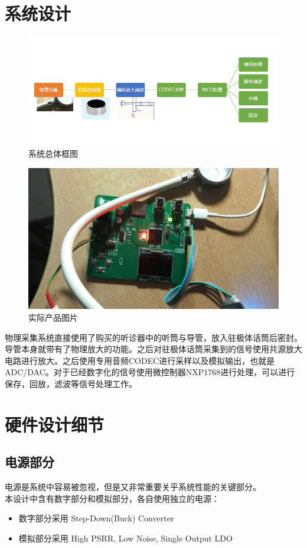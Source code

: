 \documentclass[16pt,a4paper]{article}
\begin{document}
\section{系统设计}
\begin{figure}[H]
\centering
\includegraphics[scale=0.8]{system.png}
\caption{系统总体框图}
\end{figure}
\begin{figure}[H]
\centering
\includegraphics[scale=0.3]{board.jpg}
\caption{实际产品图片}
\end{figure}
物理采集系统直接使用了购买的听诊器中的听筒与导管，放入驻极体话筒后密封。导管本身就带有了物理放大的功能。之后对驻极体话筒采集到的信号使用共源放大电路进行放大。之后使用专用音频CODEC进行采样以及模拟输出，也就是ADC/DAC。对于已经数字化的信号使用微控制器NXP1768进行处理，可以进行保存，回放，滤波等信号处理工作。

\section{硬件设计细节}
\subsection{电源部分}
电源是系统中容易被忽视，但是又非常重要关乎系统性能的关键部分。\\
本设计中含有数字部分和模拟部分，各自使用独立的电源：
\begin{itemize}
\item 数字部分采用 Step-Down(Buck) Converter
\item 模拟部分采用 High PSRR, Low Noise, Single Output LDO
\end{itemize}
\end{document}
